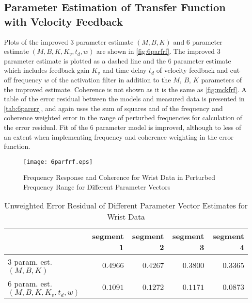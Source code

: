 \documentclass[11pt,a4paper]{article}
\begin{document}
\subsection{Parameter Estimation of Transfer Function with Velocity Feedback}
Plots of the improved 3 parameter estimate $(M, B, K)$ and 6 parameter estimate
$(M, B, K, K_v, t_d, w)$ are shown in \autoref{fig:6parfrf}. The improved 3
parameter estimate is plotted as a dashed line and the 6 parameter estimate
which includes feedback gain $K_v$ and time delay $t_d$ of velocity feedback
and cut-off frequency $w$ of the activation filter in addition to the $M$, $B$,
$K$ parameters of the improved estimate. Coherence is not shown as it is the
same as \autoref{fig:mckfrf}. A table of the error residual between the models
and measured data is presented in \autoref{tab:6parerr}, and again uses the sum
of squares and of the frequency and coherence weighted error in the range of
perturbed frequencies for calculation of the error residual. Fit of the 6
parameter model is improved, although to less of an extent when implementing
frequency and coherence weighting in the error function.

\begin{figure}
    \centering
    \texttt{[image: 6parfrf.eps]}
    \caption{Frequency Response and Coherence for Wrist Data in Perturbed
        Frequency Range for Different Parameter Vectors}
    \label{fig:6parfrf}
\end{figure}

\begin{table}
    \centering
    \begin{tabular}{|l|r|r|r|r|}
        \hline
        \nonumber & segment 1 & segment 2 & segment 3 & segment 4 \\
        \hline
        3 param. est. $(M, B, K)$ &
            $0.4966$ & $0.4267$ & $0.3800$ & $0.3365$ \\
        6 param. est. $(M, B, K, K_v, t_d, w)$ &
            $0.1091$ & $0.1272$ & $0.1171$ & $0.0873$ \\
        \hline
    \end{tabular}
    \caption{Unweighted Error Residual of Different Parameter Vector Estimates
        for Wrist Data}
    \label{tab:6parerr}
\end{table}

\end{document}
